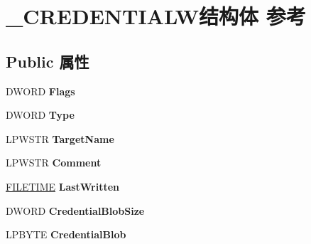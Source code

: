 \hypertarget{struct___c_r_e_d_e_n_t_i_a_l_w}{}\section{\+\_\+\+C\+R\+E\+D\+E\+N\+T\+I\+A\+L\+W结构体 参考}
\label{struct___c_r_e_d_e_n_t_i_a_l_w}
\subsection*{Public 属性}
\begin{DoxyCompactItemize}
\item 
\mbox{\label{struct___c_r_e_d_e_n_t_i_a_l_w_aa2519560c16d0eefa01a62ca9f2fbaae}} 
D\+W\+O\+RD {\bfseries Flags}
\item 
\mbox{\label{struct___c_r_e_d_e_n_t_i_a_l_w_ac7c52e2b53717aee81ebffbf21edf0d4}} 
D\+W\+O\+RD {\bfseries Type}
\item 
\mbox{\label{struct___c_r_e_d_e_n_t_i_a_l_w_a1436a35c8d3171acd9ac748383913fd9}} 
L\+P\+W\+S\+TR {\bfseries Target\+Name}
\item 
\mbox{\label{struct___c_r_e_d_e_n_t_i_a_l_w_af6ffac2d8410b6059b31afe347bf216f}} 
L\+P\+W\+S\+TR {\bfseries Comment}
\item 
\mbox{\label{struct___c_r_e_d_e_n_t_i_a_l_w_a994198842c703ba083cca03b7dadfc17}} 
\hyperlink{struct___f_i_l_e_t_i_m_e}{F\+I\+L\+E\+T\+I\+ME} {\bfseries Last\+Written}
\item 
\mbox{\label{struct___c_r_e_d_e_n_t_i_a_l_w_abe328e9879ef6f71c08f87b4a70fa500}} 
D\+W\+O\+RD {\bfseries Credential\+Blob\+Size}
\item 
\mbox{\label{struct___c_r_e_d_e_n_t_i_a_l_w_a36b13bfce084323da73ddc4801c87d8b}} 
L\+P\+B\+Y\+TE {\bfseries Credential\+Blob}
\item 
\mbox{\label{struct___c_r_e_d_e_n_t_i_a_l_w_adbf6d6aaab8ee4698bc1a52a0fd42271}} 

\end{DoxyCompactItemize}
